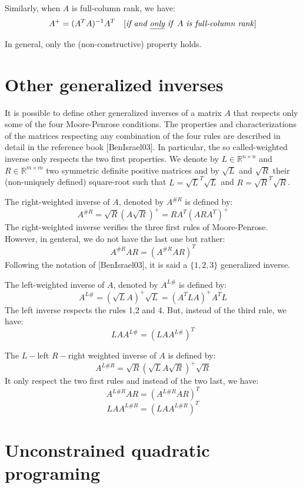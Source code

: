 \documentclass{book}
\begin{document}
Similarly, when $A$ is full-column rank, we have:
$$ A^+ = (A^TA)^{-1} A^T  \quad \textrm{[\emph{if and \underline{only} if }} A \textrm{\emph{ is full-column rank}]}$$

In general, only the (non-constructive) property  holds.

\section{Other generalized inverses}

It is possible to define other generalized inverses of a matrix $A$ that respects only some of the four Moore-Penrose conditions. The properties and characterizations of the matrices respecting any combination of the four rules are described in detail in the reference book [BenIsrael03]. In particular, the so called-weighted inverse only respects the two first properties. We denote by $L \in \mathbb{R}^{n \times n}$ and $R \in \mathbb{R}^{m \times m}$ two symmetric definite positive matrices and by $\sqrt{L}$ and $\sqrt{R}$ their (non-uniquely defined) square-root such that $L=\sqrt{L}^T\sqrt{L}$ and $R=\sqrt{R}^T\sqrt{R}$. 


The right-weighted inverse of $A$, denoted by $A^{\#R}$ is defined by:
$$ A^{\#R} = \sqrt{R}(A\sqrt{R})^+ = RA^T(ARA^T)^+ $$
The right-weighted inverse verifies the three first rules of Moore-Penrose.  However, in genteral, we do not have the last one but rather:
$$ A^{\#R} A R = (A^{\#R} A R)^T $$
Following the notation of [BenIsrael03], it is said a $\{1,2,3\}$ generalized inverse.

The left-weighted inverse of $A$, denoted by $A^{L\#}$ is defined by:
$$ A^{L\#} = (\sqrt{L}A)^+\sqrt{L} = (A^TLA)^+A^TL $$
The left inverse respects the rules 1,2 and 4. But, instead of the third rule, we have:
$$ L A A^{L\#}  = (L A A^{L\#})^T $$

The $L-$left $R-$right weighted inverse of $A$ is defined by:
$$ A^{L\#R} = \sqrt{R}(\sqrt{L}A\sqrt{R})^+\sqrt{R} $$
It only respect the two first rules and instead of the two last, we have:
$$ A^{L\#R} A R = (A^{L\#R} A R)^T $$
$$ L A A^{L\#R}  = (L A A^{L\#R})^T $$



\section{Unconstrained quadratic programing}
\end{document}

